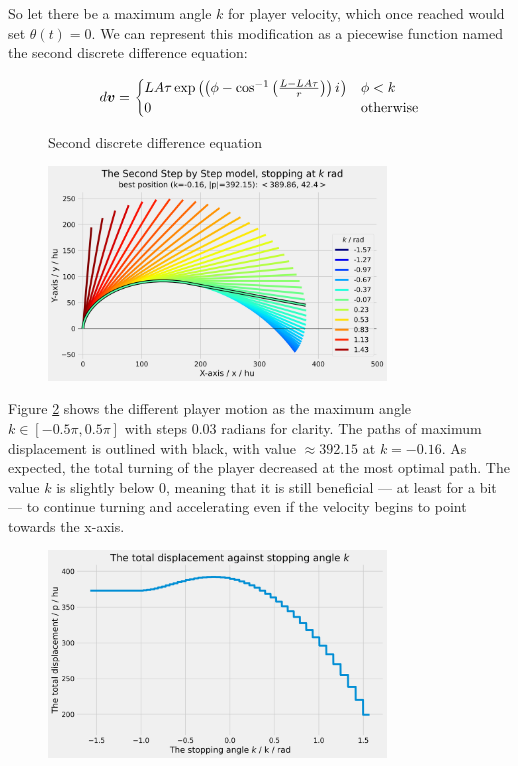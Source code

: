 So let there be a maximum angle $k$ for player velocity, which once reached would set $\theta(t) = 0$. We can represent this modification as a piecewise function named the second discrete difference equation:

\begin{figure}[H]
    \centering
    \[
        d\boldsymbol{v} = \begin{cases}
            LA\tau \exp\left(\left(\phi - \cos^{-1}\left(\frac{L-LA\tau}{r}\right)\right) {i\mkern1mu}\right) & \phi < k\\
            0 & \text{otherwise}
        \end{cases}
    \]
    \caption{Second discrete difference equation}
    \label{fig:ssbs}
\end{figure}



\begin{figure}[H]
    \centering
    \includegraphics[width=0.8\textwidth]{assets/step_by_step_2.png}
    \caption{}
    \label{fig:sbs2}
\end{figure}

Figure \ref{fig:sbs2} shows the different player motion as the maximum angle $k\in [-0.5\pi, 0.5\pi]$ with steps $0.03$ radians for clarity. The paths of maximum displacement is outlined with black, with value $\approx 392.15$ at $k=-0.16$. As expected, the total turning of the player decreased at the most optimal path. The value $k$ is slightly below $0$, meaning that it is still beneficial --- at least for a bit --- to continue turning and accelerating even if the velocity begins to point towards the x-axis.

\begin{figure}[H]
    \centering
    \includegraphics[width=0.8\textwidth]{assets/step_by_step_2k.png}
    \caption{}
    \label{fig:sbs2k}
\end{figure}

